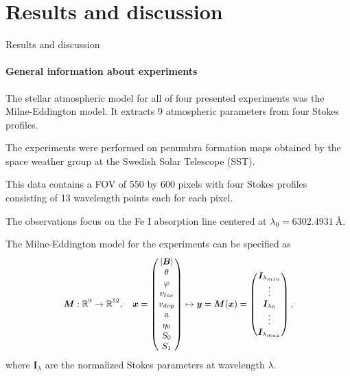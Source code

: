 \documentclass{beamer}
\newcommand\vect[1]{\ensuremath{\bm{#1}}}
\begin{document}
\section{Results and discussion}
\begin{frame}[allowframebreaks]{Results and discussion}
\framesubtitle{General information about experiments}
The stellar atmospheric model for all of four presented experiments was the Milne-Eddington model. It extracts 9 atmospheric parameters from four Stokes profiles.

The experiments were performed on penumbra formation maps obtained by the space weather group at the Swedish Solar Telescope (SST).

This data contains a FOV of 550 by 600 pixels with four Stokes profiles consisting of 13 wavelength points each for each pixel.

The observations focus on the Fe I absorption line centered at $\lambda_0 = \SI{6302.4931}{\angstrom}$.

The Milne-Eddington model for the experiments can be specified as
\begin{gather}\small\begin{gathered}\label{model:Milne-Eddington_obs}
	\vect{M}:\mathbb{R}^9 \rightarrow \mathbb{R}^{52}, \quad \vect{x} = \begin{pmatrix}
		|\vect{B}| \\
		\theta \\
		\varphi \\
		v_{los} \\
		v_{dop} \\
		a \\
		\eta_0 \\
		S_0 \\
		S_1
	\end{pmatrix} \mapsto \vect{y} = \vect{M}(\vect{x}) = \begin{pmatrix}
		\vect{I}_{\lambda_{min}} \\
		\vdots \\
		\vect{I}_{\lambda_0} \\
		\vdots \\
		\vect{I}_{\lambda_{max}}
	\end{pmatrix},
 \end{gathered}\end{gather} where $\vect{I}_\lambda$ are the normalized Stokes parameters at wavelength $\lambda$.
\end{frame}
\end{document}
